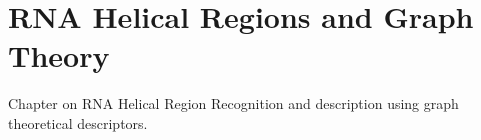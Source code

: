 \chapter{RNA Helical Regions and Graph Theory}
\label{helreg} 

Chapter on RNA Helical Region Recognition and description
using graph theoretical descriptors.




